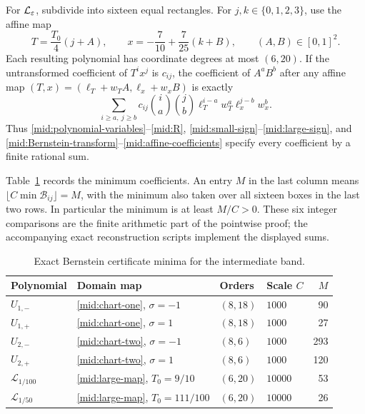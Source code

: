 For \(\mathcal L_\varepsilon\), subdivide into sixteen equal rectangles.
For \(j,k\in\{0,1,2,3\}\), use the affine map
\begin{equation}\label{mid:large-map}
 T=\frac{T_0}{4}(j+A),\qquad
 x=-\frac7{10}+\frac7{25}(k+B),\qquad (A,B)\in[0,1]^2.
\end{equation}
Each resulting polynomial has coordinate degrees at most \((6,20)\).
If the untransformed coefficient of \(T^ix^j\) is \(c_{ij}\), the
coefficient of \(A^aB^b\) after any affine map
\((T,x)=(\ell_T+w_TA,\ell_x+w_xB)\) is exactly
\begin{equation}\label{mid:affine-coefficients}
 \sum_{i\ge a,\ j\ge b}c_{ij}\binom ia\binom jb
 \ell_T^{i-a}w_T^a\ell_x^{j-b}w_x^b.
\end{equation}
Thus \eqref{mid:polynomial-variables}--\eqref{mid:R},
\eqref{mid:small-sign}--\eqref{mid:large-sign}, and
\eqref{mid:Bernstein-transform}--\eqref{mid:affine-coefficients}
specify every coefficient by a finite rational sum.

Table~\ref{mid:certificate-table} records the minimum coefficients.
An entry \(M\) in the last column means
\(\lfloor C\min\mathcal B_{ij}\rfloor=M\), with the minimum also
taken over all sixteen boxes in the last two rows. In particular the
minimum is at least \(M/C>0\). These six integer comparisons are
the finite arithmetic part of the pointwise proof; the accompanying
exact reconstruction scripts implement the displayed sums.

\begin{table}[htbp]
\centering
\begin{tabular}{llllr}
\toprule
Polynomial & Domain map & Orders & Scale \(C\) & \(M\)\\
\midrule
\(U_{1,-}\) & \eqref{mid:chart-one}, \(\sigma=-1\) & \((8,18)\) & \(1000\) & 90\\
\(U_{1,+}\) & \eqref{mid:chart-one}, \(\sigma=1\) & \((8,18)\) & \(1000\) & 27\\
\(U_{2,-}\) & \eqref{mid:chart-two}, \(\sigma=-1\) & \((8,6)\) & \(1000\) & 293\\
\(U_{2,+}\) & \eqref{mid:chart-two}, \(\sigma=1\) & \((8,6)\) & \(1000\) & 120\\
\(\mathcal L_{1/100}\) & \eqref{mid:large-map}, \(T_0=9/10\) & \((6,20)\) & \(10000\) & 53\\
\(\mathcal L_{1/50}\) & \eqref{mid:large-map}, \(T_0=111/100\) & \((6,20)\) & \(10000\) & 26\\
\bottomrule
\end{tabular}
\caption{Exact Bernstein certificate minima for the intermediate band.}
\label{mid:certificate-table}
\end{table}

